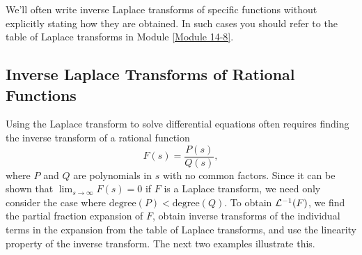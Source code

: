 \documentclass{ximera}
\begin{document}
\begin{remark}
We'll often write inverse Laplace transforms of specific
functions without explicitly stating how they are obtained. In such
cases you should refer to the table of Laplace transforms in Module \ref{Module 14-8}. %
\end{remark}

\subsection*{Inverse Laplace Transforms of Rational Functions}

Using the Laplace transform to
 solve differential equations
often requires  finding the inverse
transform of a rational function
$$
F(s)=\frac{P(s)}{Q(s)},
$$
where $P$ and $Q$ are polynomials in $s$ with no common factors. Since
it can be shown that $\lim_{s\rightarrow\infty}F(s)=0$ if $F$ is a Laplace
transform, we need only consider the case where
$\mbox{degree}(P)<\mbox{degree}(Q)$. To obtain ${\cal L}^{-1}(F)$, we
find the partial fraction expansion of $F$, obtain inverse transforms
of the individual terms in the expansion from the table of Laplace
transforms, and use the linearity property of the inverse transform.
The next two examples illustrate this.
\end{document}
